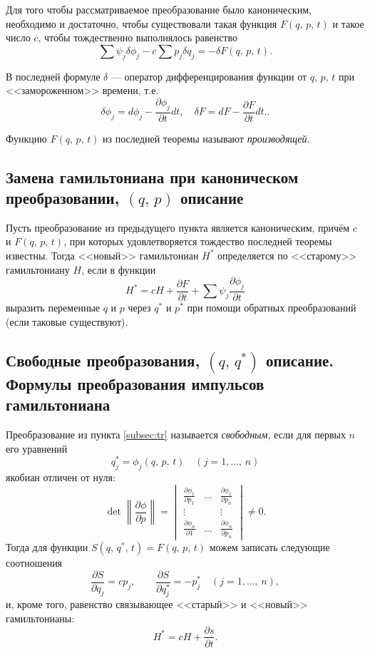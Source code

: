 \documentclass[a4paper]{article}
\begin{document}
\begin{thm}
	Для того чтобы рассматриваемое преобразование было каноническим,
	необходимо и достаточно, чтобы существовали такая функция 
	$F(q,\,p,\,t)$ и такое число $c$, чтобы тождественно выполнялось
	равенство
	\[
		\sum \psi_j \delta \phi_j -c \sum p_j \delta q_j=-\delta F(q,\,
		p,\,t)
	.\] 
\end{thm}
В последней формуле $\delta$ --- оператор дифференцирования функции от
$q,\,p,\,t$ при <<замороженном>> времени, т.\:е.
\[
\delta \phi_j =d \phi_j - \frac{\partial \phi_j}{\partial t} dt,\quad
\delta F=dF-\frac{\partial F}{\partial t} dt.
.\]
\begin{dfn}
	Функцию $F(q,\,p,\,t)$ из последней теоремы называют \emph{производящей}.
\end{dfn}
\subsection{Замена гамильтониана при каноническом преобразовании, $(q,\,p)$ 
описание}
\begin{thm}
Пусть преобразование из предыдущего пункта является каноническим, причём
$c$ и  $F(q,\,p,\,t)$, при которых удовлетворяется тождество последней
теоремы известны. Тогда <<новый>>  гамильтониан $H^*$ определяется по
<<старому>> гамильтониану $H$, если в функции
\[
H^*=cH+\frac{\partial F}{\partial t} +\sum \psi_j \frac{\partial \phi_j}{\partial t} 
\]
выразить переменные $q$ и $p$ через  $q^*$ и $p^*$ при помощи обратных
преобразований (если таковые существуют).
\end{thm}
\subsection{Свободные  преобразования, $(q,\,q^*)$ описание. Формулы
	преобразования
импульсов гамильтониана}
Преобразование из пункта \ref{subsec:tr} называется \emph{свободным}, если
для первых $n$ его уравнений
\[
	q^*_j=\phi_j(q,\,p,\,t) \quad (j=1,\ldots,\,n)
\]
якобиан отличен от нуля:
\[
\det \left\|\frac{\partial \phi}{\partial p} \right\|=
\begin{vmatrix}
	\frac{\partial \phi_1}{\partial p_1}  & \hdots & \frac{\partial \phi_1}{\partial p_n} \\
	\vdots & & \vdots\\
	\frac{\partial \phi_n}{\partial 1} & \hdots & \frac{\partial \phi_n}{\partial p_n} 
\end{vmatrix} \neq 0
.\] 
Тогда для функции $S(q,\,q^*,\,t)=F(q,\,p,\,t)$ можем записать следующие
соотношения
 \[
\frac{\partial S}{\partial q_j} =c p_j, \qquad \frac{\partial S}{\partial q_j^*} =
-p_j^* \quad (j=1,\ldots,\,n)
,\] 
и, кроме того, равенство связывающее <<старый>> и <<новый>> гамильтонианы:
\[
H^*=cH+\frac{\partial s}{\partial t} 
.\] 
\end{document}

